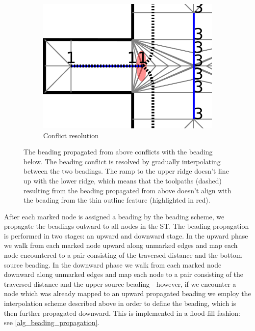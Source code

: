 \begin{figure}
\begin{subfigure}{.45\columnwidth}
\includegraphics[height=\figheight]{sources/method/beading_conflict_solved.pdf}
\caption{Conflict resolution}\label{beading_conflict_solved}
\end{subfigure}
\caption{
 The beading propagated from above conflicts with the beading below.
 The beading conflict is resolved by gradually interpolating between the two beadings.
The ramp to the upper ridge doesn't line up with the lower ridge, which means that
the toolpaths (dashed) resulting from the beading propagated from above doesn't align with the beading from the thin outline feature (highlighted in red).
}
\label{beading_conflict_problem}
\end{figure}

After each marked node is assigned a beading by the beading scheme, we propagate the beadings outward to all nodes in the ST.
The beading propagation is performed in two stages: an upward and downward stage.
In the upward phase we walk from each marked node upward along unmarked edges and map each node encountered to a pair consisting of the traversed distance and the bottom source beading.
In the downward phase we walk from each marked node downward along unmarked edges and map each node to a pair consisting of the traversed distance and the upper source beading -
however, if we encounter a node which was already mapped to an upward propagated beading we employ the interpolation scheme described above in order to define the beading, which is then further propagated downward.
This is implemented in a flood-fill fashion: see \cref{alg_beading_propagation}.

